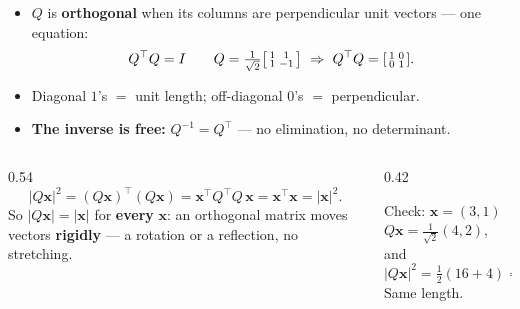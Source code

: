 \documentclass[aspectratio=169, 11pt]{beamer}
\newcommand{\xx}{\mathbf{x}}
\newcommand{\T}{^{\top}}
\begin{document}
\begin{frame}[t, plain]
  \begin{itemize}
    \setlength{\itemsep}{6pt}
    \item $Q$ is \textbf{orthogonal} when its columns are perpendicular unit vectors --- one equation:
          \[ Q\T Q=I \qquad Q=\tfrac1{\sqrt2}\begin{bsmallmatrix} 1 & 1\\ 1 & -1 \end{bsmallmatrix}
             \ \Rightarrow\ Q\T Q=\begin{bsmallmatrix} 1 & 0\\ 0 & 1 \end{bsmallmatrix}. \]
    \item Diagonal $1$'s $=$ unit length; off-diagonal $0$'s $=$ perpendicular.
    \item \textbf{The inverse is free:} $Q^{-1}=Q\T$ --- no elimination, no determinant.
  \end{itemize}
\end{frame}

\begin{frame}[t, plain]
  \begin{columns}[T]
    \begin{column}{0.54\textwidth}
      \[ |Q\xx|^2=(Q\xx)\T(Q\xx)=\xx\T Q\T Q\,\xx=\xx\T\xx=|\xx|^2. \]
      So $|Q\xx|=|\xx|$ for \textbf{every} $\xx$: an orthogonal matrix moves vectors \textbf{rigidly} --- a
      rotation or a reflection, no stretching.
    \end{column}
    \begin{column}{0.42\textwidth}
      \begin{block}{Check: $\xx=(3,1)$}
        $Q\xx=\tfrac1{\sqrt2}(4,2)$, and
        \[ |Q\xx|^2=\tfrac12(16+4)=10=|\xx|^2. \]
        Same length.
      \end{block}
    \end{column}
  \end{columns}
\end{frame}
\end{document}
